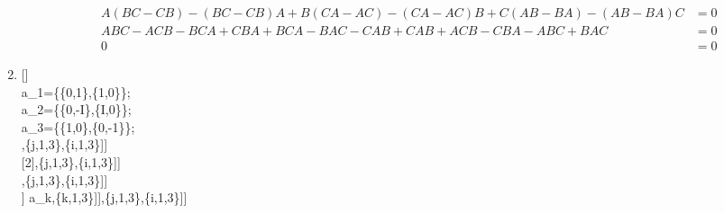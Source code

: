 \documentclass[11pt]{article}
\begin{document}
\begin{enumerate}
\begin{enumerate}
\begin{align*}
        A(BC-CB)-(BC-CB)A+B(CA-AC)-(CA-AC)B+C(AB-BA)-(AB-BA)C&=0\\
        ABC-ACB-BCA+CBA+BCA-BAC-CAB+CAB+ACB-CBA-ABC+BAC&=0\\
        0&=0
      \end{align*}
    \end{enumerate}
    \item
    []\\
    a_1=\{\{0,1\},\{1,0\}\};\\
    a_2=\{\{0,-I\},\{I,0\}\};\\
    a_3=\{\{1,0\},\{0,-1\}\};\\
    \left[\text{Table}\left[\text{MatrixForm}\left[a_i.a_j+a_j.a_i\right],\{j,1,3\},\{i,1,3\}\right]\right]\\
    \left[\text{Table}\left[a_i.a_j+a_j.a_i==2 \text{KroneckerDelta}[j,i] [2],\{j,1,3\},\{i,1,3\}\right]\right]\\
    \left[\text{Table}\left[\text{MatrixForm}\left[a_i.a_j-a_j.a_i\right],\{j,1,3\},\{i,1,3\}\right]\right]\\
    \left[\text{Table}\left[a_i.a_j-a_j.a_i\text{==}2 I \text{Total}\left[\text{Table}\left[\text{LeviCivitaTensor}[3][[i,j,k]] a_k,\{k,1,3\}\right]\right],\{j,1,3\},\{i,1,3\}\right]\right]


\end{enumerate}
\end{document}
